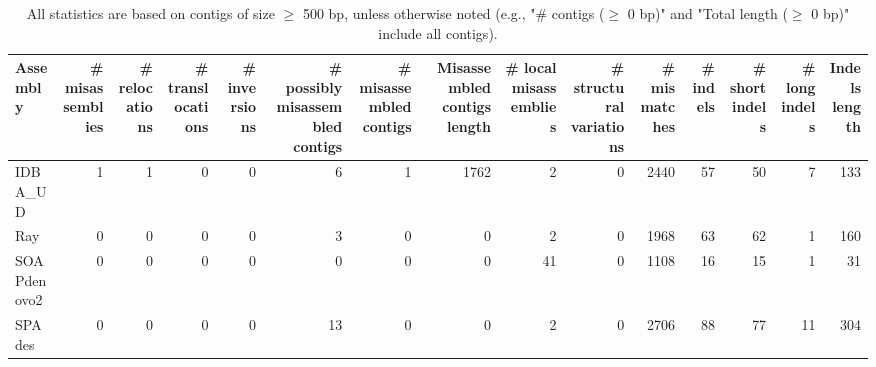 \documentclass[12pt,a4paper]{article}
\begin{document}
\begin{table}[ht]
\begin{center}
\caption{All statistics are based on contigs of size $\geq$ 500 bp, unless otherwise noted (e.g., "\# contigs ($\geq$ 0 bp)" and "Total length ($\geq$ 0 bp)" include all contigs).}
\begin{tabular}{|l*{14}{|r}|}
\hline
Assembly & \# misassemblies &     \# relocations &     \# translocations &     \# inversions & \# possibly misassembled contigs & \# misassembled contigs & Misassembled contigs length & \# local misassemblies & \# structural variations & \# mismatches & \# indels &     \# short indels &     \# long indels & Indels length \\ \hline
IDBA\_UD & 1 & 1 & 0 & 0 & 6 & 1 & 1762 & 2 & 0 & 2440 & 57 & 50 & 7 & 133 \\ \hline
Ray & 0 & 0 & 0 & 0 & 3 & 0 & 0 & 2 & 0 & 1968 & 63 & 62 & 1 & 160 \\ \hline
SOAPdenovo2 & 0 & 0 & 0 & 0 & 0 & 0 & 0 & 41 & 0 & 1108 & 16 & 15 & 1 & 31 \\ \hline
SPAdes & 0 & 0 & 0 & 0 & 13 & 0 & 0 & 2 & 0 & 2706 & 88 & 77 & 11 & 304 \\ \hline
\end{tabular}
\end{center}
\end{table}
\end{document}
